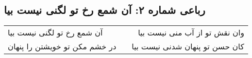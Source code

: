 \begin{center}
\section*{رباعی شماره ۲: آن شمع رخ تو لگنی نیست بیا}
\label{sec:0002}
\begin{longtable}{l p{0.5cm} r}
آن شمع رخ تو لگنی نیست بیا
&&
وان نقش تو از آب منی نیست بیا
\\
در خشم مکن تو خویشتن را پنهان
&&
کان حسن تو پنهان شدنی نیست بیا
\\
\end{longtable}
\end{center}
